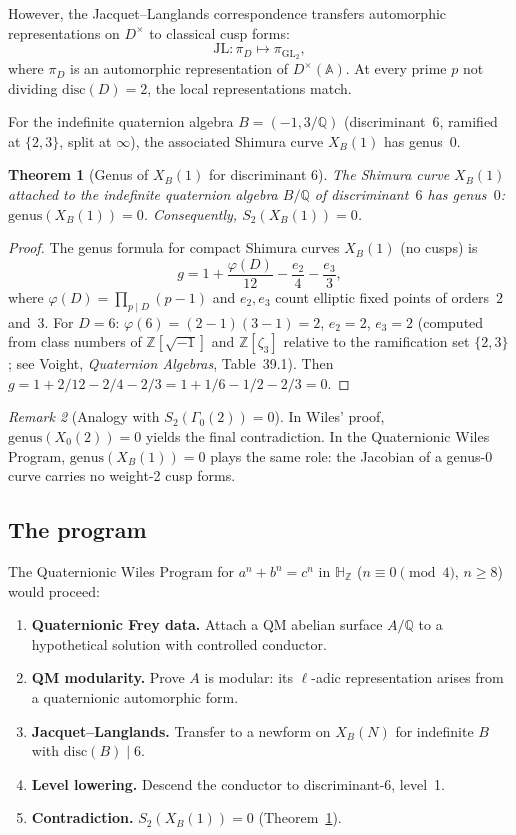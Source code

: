 \documentclass[11pt]{amsart}
\theoremstyle{plain}
\newtheorem{theorem}{Theorem}[section]
\theoremstyle{definition}
\theoremstyle{remark}
\newtheorem{remark}[theorem]{Remark}
\newcommand{\Z}{\mathbb{Z}}
\newcommand{\Q}{\mathbb{Q}}
\newcommand{\HH}{\mathbb{H}}
\newcommand{\GL}{\mathrm{GL}}
\begin{document}
However, the Jacquet--Langlands correspondence transfers automorphic representations
on $D^\times$ to classical cusp forms:
\[
  \mathrm{JL} : \pi_D \longmapsto \pi_{\GL_2},
\]
where $\pi_D$ is an automorphic representation of $D^\times(\mathbb{A})$.
At every prime $p$ not dividing $\mathrm{disc}(D) = 2$,
the local representations match.

For the indefinite quaternion algebra $B = (-1, 3/\Q)$
(discriminant~$6$, ramified at $\{2, 3\}$, split at $\infty$),
the associated Shimura curve $X_B(1)$ has genus~0.

\begin{theorem}[Genus of $X_B(1)$ for discriminant 6]\label{thm:xb1}
The Shimura curve $X_B(1)$ attached to the indefinite quaternion algebra $B/\Q$
of discriminant~$6$ has genus~$0$:
$\mathrm{genus}(X_B(1)) = 0$.
Consequently, $S_2(X_B(1)) = 0$.
\end{theorem}

\begin{proof}
The genus formula for compact Shimura curves $X_B(1)$ (no cusps) is
\[
  g = 1 + \frac{\varphi(D)}{12} - \frac{e_2}{4} - \frac{e_3}{3},
\]
where $\varphi(D) = \prod_{p \mid D}(p-1)$ and $e_2, e_3$
count elliptic fixed points of orders~$2$ and~$3$.
For $D = 6$: $\varphi(6) = (2-1)(3-1) = 2$, $e_2 = 2$, $e_3 = 2$
(computed from class numbers of $\Z[\sqrt{-1}]$ and $\Z[\zeta_3]$
relative to the ramification set $\{2,3\}$; see
Voight, \emph{Quaternion Algebras}, Table~39.1).
Then $g = 1 + 2/12 - 2/4 - 2/3 = 1 + 1/6 - 1/2 - 2/3 = 0$.
\end{proof}

\begin{remark}[Analogy with $S_2(\Gamma_0(2)) = 0$]
In Wiles' proof, $\mathrm{genus}(X_0(2)) = 0$ yields the final contradiction.
In the Quaternionic Wiles Program, $\mathrm{genus}(X_B(1)) = 0$ plays the same role:
the Jacobian of a genus-0 curve carries no weight-2 cusp forms.
\end{remark}

\subsection{The program}

The Quaternionic Wiles Program for $a^n + b^n = c^n$ in $\HH_\Z$
($n \equiv 0 \pmod 4$, $n \geq 8$) would proceed:

\begin{enumerate}[label=\textbf{Step \arabic*.}]
  \item \textbf{Quaternionic Frey data.} Attach a QM abelian surface $A/\Q$
    to a hypothetical solution with controlled conductor.
  \item \textbf{QM modularity.} Prove $A$ is modular: its $\ell$-adic representation
    arises from a quaternionic automorphic form.
  \item \textbf{Jacquet--Langlands.} Transfer to a newform on $X_B(N)$
    for indefinite $B$ with $\mathrm{disc}(B) \mid 6$.
  \item \textbf{Level lowering.} Descend the conductor to discriminant-6, level~1.
  \item \textbf{Contradiction.} $S_2(X_B(1)) = 0$ (Theorem~\ref{thm:xb1}).
\end{enumerate}
\end{document}
